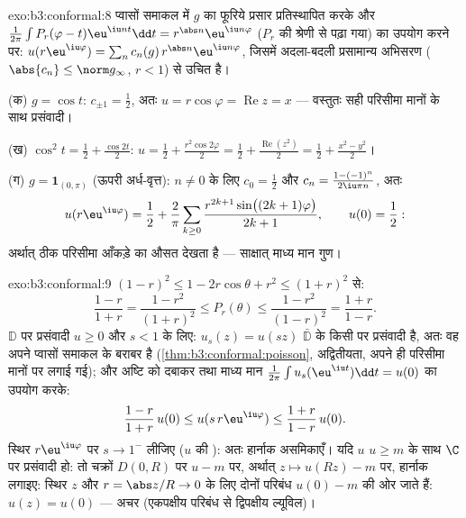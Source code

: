 \begin{solution}{exo:b3:conformal:8}
प्वासों समाकल में $g$ का फूरिये प्रसार प्रतिस्थापित करके और $\frac1{2\pi}\int P_r(\varphi - t)\eu^{\iu nt}\dd t =
r^{\abs n}\eu^{\iu n\varphi}$
($P_r$ की श्रेणी से पढ़ा गया) का उपयोग करने पर: $u(r\eu^{\iu\varphi}) = \sum_nc_n(g)\,r^{\abs
n}\eu^{\iu n\varphi}$, जिसमें अदला-बदली
प्रसामान्य अभिसरण ($\abs{c_n} \leq \norm g_\infty$, $r < 1$) से उचित है।

(क) $g = \cos t$: $c_{\pm1} = \frac12$, अतः $u =
r\cos\varphi = \operatorname{Re}z = x$ --- वस्तुतः सही परिसीमा मानों के साथ
प्रसंवादी।

(ख) $\cos^2t = \frac12 + \frac{\cos 2t}2$: $u = \frac12 +
\frac{r^2\cos2\varphi}2 = \frac12 +
\frac{\operatorname{Re}(z^2)}2 = \frac12 + \frac{x^2 -
y^2}{2}$।

(ग) $g = \mathbf 1_{(0,\pi)}$ (ऊपरी अर्ध-वृत्त): $n \neq
0$ के लिए $c_0 =
\frac12$ और $c_n = \frac{1 - (-1)^n}{2\iu\pi n}$, अतः
\[
u(r\eu^{\iu\varphi}) = \frac12 + \frac2\pi\sum_{k\geq0}
\frac{r^{2k+1}\sin\bigl((2k+1)\varphi\bigr)}{2k + 1},
\qquad u(0) = \frac12 :
\]
अर्थात्  ठीक परिसीमा आँकड़े का औसत देखता है --- साक्षात् माध्य
मान गुण।
\end{solution}

\begin{solution}{exo:b3:conformal:9}
$(1-r)^2 \leq 1 - 2r\cos\theta + r^2 \leq (1+r)^2$ से:
\[
\frac{1-r}{1+r} = \frac{1 - r^2}{(1+r)^2} \leq P_r(\theta)
\leq \frac{1 - r^2}{(1 - r)^2} = \frac{1+r}{1-r} .
\]
$\mathbb D$ पर प्रसंवादी $u \geq 0$ और $s < 1$ के लिए: $u_s(z) =
u(sz)$ $\bar{\mathbb D}$ के किसी 
पर प्रसंवादी है, अतः वह अपने प्वासों समाकल के बराबर है (\cref{thm:b3:conformal:poisson},
अद्वितीयता, अपने ही परिसीमा मानों पर लगाई गई); और अष्टि को दबाकर
तथा माध्य मान $\frac1{2\pi}\int u_s(\eu^{\iu t})\dd t = u(0)$ का उपयोग करके:
\[
\frac{1-r}{1+r}\,u(0) \leq u(s\,r\eu^{\iu\varphi}) \leq
\frac{1+r}{1-r}\,u(0).
\]
स्थिर $r\eu^{\iu\varphi}$ पर $s \to 1^-$ लीजिए ($u$ की ): अतः हार्नाक असमिकाएँ।
यदि $u$ $u \geq m$ के साथ $\C$ पर प्रसंवादी हो: तो चक्रों $D(0, R)$ पर
$u - m$ पर, अर्थात् $z \mapsto u(Rz) - m$ पर, हार्नाक लगाइए: स्थिर $z$ और $r =
\abs z/R \to 0$ के
लिए दोनों परिबंध $u(0) - m$ की ओर जाते हैं: $u(z) =
u(0)$ --- अचर (एकपक्षीय परिबंध
से द्विपक्षीय ल्यूविल)।
\end{solution}

